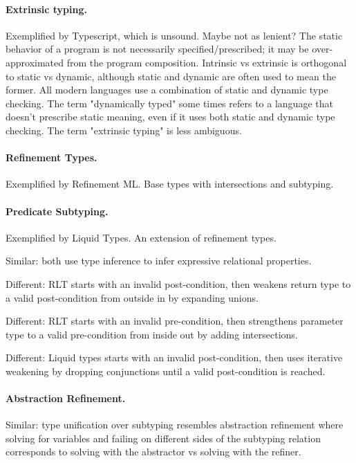 \documentclass[acmsmall]{acmart}
\begin{document}
\paragraph{Extrinsic typing.}
Exemplified by Typescript, which is unsound. Maybe not as lenient?  
The static behavior of a program is not necessarily specified/prescribed; 
it may be over-approximated from the program composition. 
Intrinsic vs extrinsic is orthogonal to static vs dynamic, although static and dynamic are often used to mean the former.
All modern languages use a combination of static and dynamic type checking.
The term "dynamically typed" some times refers to a language that doesn't prescribe static meaning,
even if it uses both static and dynamic type checking. The term "extrinsic typing" is less ambiguous.

\paragraph{Refinement Types.}
Exemplified by Refinement ML. Base types with intersections and subtyping.

\paragraph{Predicate Subtyping.}
Exemplified by Liquid Types. An extension of refinement types.

Similar: both use type inference to infer expressive relational properties. 

Different: RLT starts with an invalid post-condition, then weakens return type to a valid post-condition from outside in by expanding unions.

Different: RLT starts with an invalid pre-condition, then strengthens parameter type to a valid pre-condition from inside out by adding intersections.

Different: Liquid types starts with an invalid post-condition, then uses iterative weakening by dropping conjunctions until a valid post-condition is reached.


\paragraph{Abstraction Refinement.} 
Similar: type unification over subtyping resembles abstraction refinement  
where solving for variables and failing on different sides of the subtyping relation corresponds to
solving with the abstractor vs solving with the refiner.
\end{document}
